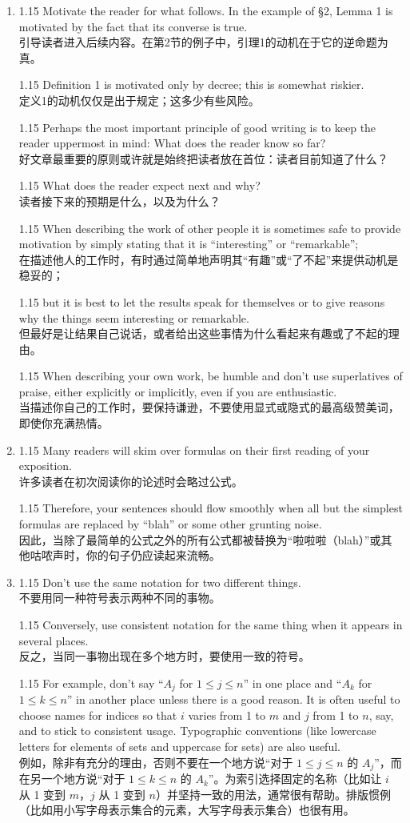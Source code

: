 \documentclass[12pt,a4paper]{article}
\newcommand{\bilingual}[2]{
    \begin{spacing}{1.15} %
        \noindent \normalsize #1 \\[-0.5ex] %
        \small \textcolor{blue!70!black}{#2} %
    \end{spacing}
    \vspace{0.8em} %
}
\begin{document}
\begin{enumerate}
\item \bilingual{Motivate the reader for what follows. In the example of \S 2, Lemma 1 is motivated by the fact that its converse is true.}{引导读者进入后续内容。在第2节的例子中，引理1的动机在于它的逆命题为真。} %
\bilingual{Definition 1 is motivated only by decree; this is somewhat riskier.}{定义1的动机仅仅是出于规定；这多少有些风险。} %
\bilingual{Perhaps the most important principle of good writing is to keep the reader uppermost in mind: What does the reader know so far?}{好文章最重要的原则或许就是始终把读者放在首位：读者目前知道了什么？} %
\bilingual{What does the reader expect next and why?}{读者接下来的预期是什么，以及为什么？} %
\bilingual{When describing the work of other people it is sometimes safe to provide motivation by simply stating that it is ``interesting'' or ``remarkable'';}{在描述他人的工作时，有时通过简单地声明其“有趣”或“了不起”来提供动机是稳妥的；} %
\bilingual{but it is best to let the results speak for themselves or to give reasons why the things seem interesting or remarkable.}{但最好是让结果自己说话，或者给出这些事情为什么看起来有趣或了不起的理由。} %
\bilingual{When describing your own work, be humble and don't use superlatives of praise, either explicitly or implicitly, even if you are enthusiastic.}{当描述你自己的工作时，要保持谦逊，不要使用显式或隐式的最高级赞美词，即使你充满热情。} %

\item \bilingual{Many readers will skim over formulas on their first reading of your exposition.}{许多读者在初次阅读你的论述时会略过公式。} %
\bilingual{Therefore, your sentences should flow smoothly when all but the simplest formulas are replaced by ``blah'' or some other grunting noise.}{因此，当除了最简单的公式之外的所有公式都被替换为“啦啦啦（blah）”或其他咕哝声时，你的句子仍应读起来流畅。} %

\item \bilingual{Don't use the same notation for two different things.}{不要用同一种符号表示两种不同的事物。} %
\bilingual{Conversely, use consistent notation for the same thing when it appears in several places.}{反之，当同一事物出现在多个地方时，要使用一致的符号。} %
\bilingual{For example, don't say ``$A_{j}$ for $1\le j\le n$'' in one place and ``$A_{k}$ for $1\le k\le n$'' in another place unless there is a good reason. It is often useful to choose names for indices so that $i$ varies from 1 to $m$ and $j$ from 1 to $n$, say, and to stick to consistent usage. Typographic conventions (like lowercase letters for elements of sets and uppercase for sets) are also useful.}{例如，除非有充分的理由，否则不要在一个地方说“对于 $1\le j\le n$ 的 $A_{j}$”，而在另一个地方说“对于 $1\le k\le n$ 的 $A_{k}$”。为索引选择固定的名称（比如让 $i$ 从 1 变到 $m$，$j$ 从 1 变到 $n$）并坚持一致的用法，通常很有帮助。排版惯例（比如用小写字母表示集合的元素，大写字母表示集合）也很有用。} %


\end{enumerate}
\end{document}
